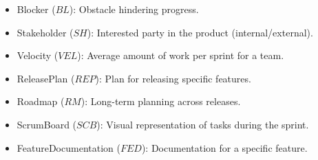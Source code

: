 \documentclass[11pt]{article}
\begin{document}
\begin{itemize}
    \item Blocker ($BL$): Obstacle hindering progress.
    \item Stakeholder ($SH$): Interested party in the product (internal/external).
    \item Velocity ($VEL$): Average amount of work per sprint for a team.
    \item ReleasePlan ($REP$): Plan for releasing specific features.
    \item Roadmap ($RM$): Long-term planning across releases.
    \item ScrumBoard ($SCB$): Visual representation of tasks during the sprint.
    \item FeatureDocumentation ($FED$): Documentation for a specific feature.
\end{itemize}
\end{document}

